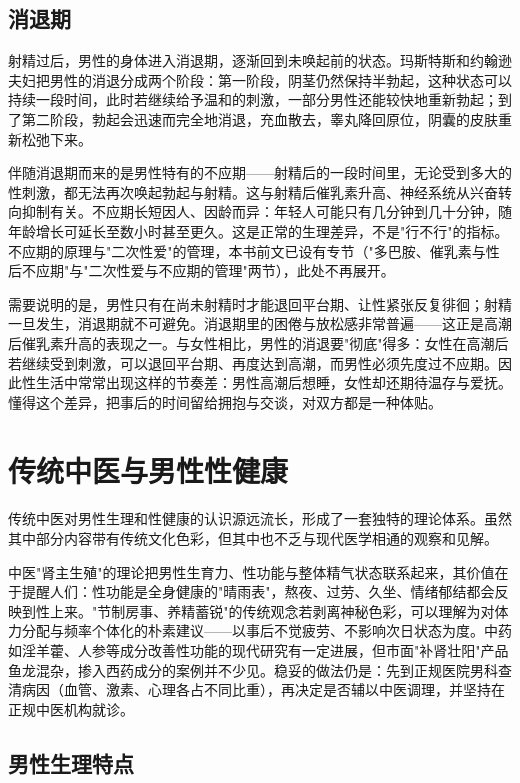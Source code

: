 \subsection{消退期}

射精过后，男性的身体进入消退期，逐渐回到未唤起前的状态。玛斯特斯和约翰逊夫妇把男性的消退分成两个阶段：第一阶段，阴茎仍然保持半勃起，这种状态可以持续一段时间，此时若继续给予温和的刺激，一部分男性还能较快地重新勃起；到了第二阶段，勃起会迅速而完全地消退，充血散去，睾丸降回原位，阴囊的皮肤重新松弛下来。

伴随消退期而来的是男性特有的不应期——射精后的一段时间里，无论受到多大的性刺激，都无法再次唤起勃起与射精。这与射精后催乳素升高、神经系统从兴奋转向抑制有关。不应期长短因人、因龄而异：年轻人可能只有几分钟到几十分钟，随年龄增长可延长至数小时甚至更久。这是正常的生理差异，不是"行不行"的指标。不应期的原理与"二次性爱"的管理，本书前文已设有专节（"多巴胺、催乳素与性后不应期"与"二次性爱与不应期的管理"两节），此处不再展开。

需要说明的是，男性只有在尚未射精时才能退回平台期、让性紧张反复徘徊；射精一旦发生，消退期就不可避免。消退期里的困倦与放松感非常普遍——这正是高潮后催乳素升高的表现之一。与女性相比，男性的消退要"彻底"得多：女性在高潮后若继续受到刺激，可以退回平台期、再度达到高潮，而男性必须先度过不应期。因此性生活中常常出现这样的节奏差：男性高潮后想睡，女性却还期待温存与爱抚。懂得这个差异，把事后的时间留给拥抱与交谈，对双方都是一种体贴。

\section{传统中医与男性性健康}

传统中医对男性生理和性健康的认识源远流长，形成了一套独特的理论体系。虽然其中部分内容带有传统文化色彩，但其中也不乏与现代医学相通的观察和见解。


中医"肾主生殖"的理论把男性生育力、性功能与整体精气状态联系起来，其价值在于提醒人们：性功能是全身健康的"晴雨表"，熬夜、过劳、久坐、情绪郁结都会反映到性上来。"节制房事、养精蓄锐"的传统观念若剥离神秘色彩，可以理解为对体力分配与频率个体化的朴素建议——以事后不觉疲劳、不影响次日状态为度。中药如淫羊藿、人参等成分改善性功能的现代研究有一定进展，但市面"补肾壮阳"产品鱼龙混杂，掺入西药成分的案例并不少见。稳妥的做法仍是：先到正规医院男科查清病因（血管、激素、心理各占不同比重），再决定是否辅以中医调理，并坚持在正规中医机构就诊。

\subsection{男性生理特点}


